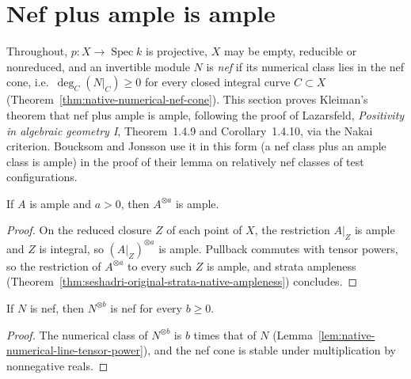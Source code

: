 \section{Nef plus ample is ample}

Throughout, $p:X\to\operatorname{Spec}k$ is projective, $X$ may be empty, reducible or
nonreduced, and an invertible module $N$ is \emph{nef} if its numerical class lies in the nef
cone, i.e.\ $\deg_C(N|_C)\ge0$ for every closed integral curve $C\subset X$
(Theorem~\ref{thm:native-numerical-nef-cone}). This section proves Kleiman's theorem that
nef plus ample is ample, following the proof of Lazarsfeld, \emph{Positivity in algebraic
geometry I}, Theorem~1.4.9 and Corollary~1.4.10, via the Nakai criterion. Boucksom and
Jonsson use it in this form (a nef class plus an ample class is ample) in the proof of their
lemma on relatively nef classes of test configurations.

\begin{lemma}
\label{lem:nef-ample-positive-power-ample}
\leanok
{}
If $A$ is ample and $a>0$, then $A^{\otimes a}$ is ample.
\end{lemma}
\begin{proof}
On the reduced closure $Z$ of each point of $X$, the restriction $A|_Z$ is ample and $Z$ is
integral, so $(A|_Z)^{\otimes a}$ is ample. Pullback commutes with tensor powers, so the
restriction of $A^{\otimes a}$ to every such $Z$ is ample, and strata ampleness
(Theorem~\ref{thm:seshadri-original-strata-native-ampleness}) concludes.
\end{proof}

\begin{lemma}
\label{lem:nef-ample-nef-power}
\leanok
{}
If $N$ is nef, then $N^{\otimes b}$ is nef for every $b\ge0$.
\end{lemma}
\begin{proof}
The numerical class of $N^{\otimes b}$ is $b$ times that of $N$
(Lemma~\ref{lem:native-numerical-line-tensor-power}), and the nef cone is stable under
multiplication by nonnegative reals.
\end{proof}

